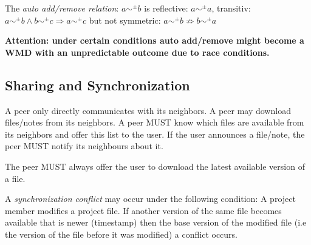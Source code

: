 The \emph{auto add/remove relation}: $a \sim ^\pm b$ is reflective: $a \sim ^\pm a$, transitiv: $a \sim ^\pm b \wedge b\sim ^\pm c \Rightarrow a \sim ^\pm c$ but not symmetric: $a \sim ^\pm b \not\Rightarrow b \sim ^\pm a$


\textbf{Attention: under certain conditions auto add/remove might become a WMD with an unpredictable outcome due to race conditions.} 


\subsection{Sharing and Synchronization}
A peer only directly communicates with its neighbors. A peer may download files/notes from its neighbors. A peer MUST know which files are available from its neighbors and offer this list to the user. If the user announces a file/note, the peer MUST notify its neighbours about it.


The peer MUST always offer the user to download the latest available version of a file.

A \emph{synchronization conflict} may occur under the following condition: A project member modifies a project file. If another version of the same file becomes available that is newer (timestamp) then the base version of the modified file (i.e the version of the file before it was modified) a conflict occurs.

